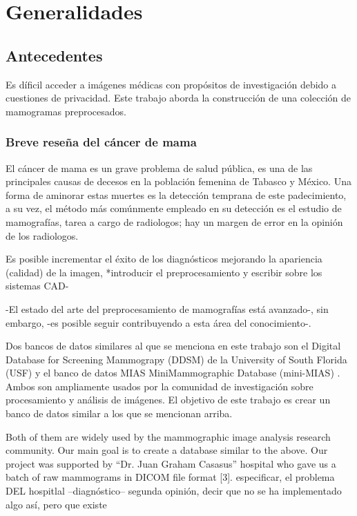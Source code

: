 \chapter{Generalidades}

 \setcounter{page}{1}

\section{Antecedentes}

Es díficil acceder a imágenes médicas con propósitos de investigación debido a
cuestiones de privacidad. Este trabajo aborda la construcción de una colección
de mamogramas preprocesados.

\subsection{Breve reseña del cáncer de mama}

El cáncer de mama es un grave problema de salud pública, es una de las
principales causas de decesos en la población femenina de Tabasco y México. Una 
forma de aminorar estas muertes es la detección temprana de este padecimiento, a
su vez, el método más comúnmente empleado en su detección es el estudio de
mamografías, tarea a cargo de radiologos; hay un margen de error en la opinión
de los radiologos.

Es posible incrementar el éxito de los diagnósticos mejorando la apariencia
(calidad) de la imagen, *introducir el preprocesamiento y escribir sobre los
sistemas CAD-

-El estado del arte del preprocesamiento de mamografías está avanzado-, sin embargo,
-es posible seguir contribuyendo a esta área del conocimiento-. 

Dos bancos de datos similares al que se menciona en este trabajo son el Digital
Database for Screening Mammograpy (DDSM) de la University of South Florida
(USF) \cite{heath2000digital} y el banco de datos MIAS MiniMammographic
Database (mini-MIAS) \cite{sucklingmini}.  Ambos son ampliamente usados por la
comunidad de investigación sobre procesamiento y análisis de imágenes. El
objetivo de este trabajo es crear un banco de datos similar a los que se
mencionan arriba. 

Both of them are widely used by the mammographic image analysis research
community.  Our main goal is to create a database similar to the above.  Our
project was supported by “Dr. Juan Graham Casasus” hospital who gave us a batch
of raw mammograms in DICOM file format [3].  especificar, el problema DEL
hospitlal --diagnóstico-- segunda opinión, decir que no se ha implementado algo
así, pero que existe
 
